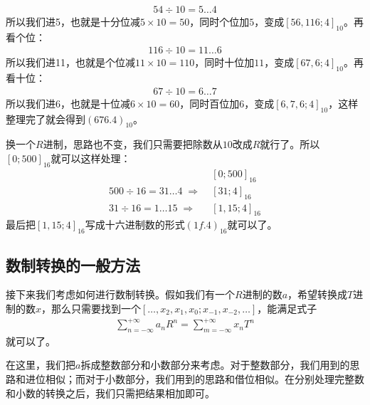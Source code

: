 \begin{align*}
54\div10=5\ldots4
\end{align*}
所以我们进5，也就是十分位减$5\times10=50$，同时个位加$5$，变成$[56,116;4]_{10}$。再看个位：
\begin{align*}
116\div10=11\ldots6
\end{align*}
所以我们进11，也就是个位减$11\times10=110$，同时十位加$11$，变成$[67,6;4]_{10}$。再看十位：
\begin{align*}
67\div10=6\ldots7
\end{align*}
所以我们进6，也就是十位减$6\times10=60$，同时百位加$6$，变成$[6,7,6;4]_{10}$，这样整理完了就会得到$(676.4)_{10}$。\par
换一个$R$进制，思路也不变，我们只需要把除数从$10$改成$R$就行了。所以$[0;500]_{16}$就可以这样处理：
\begin{align*}
{}&[0;500]_{16}\\
500\div16=31\ldots4\;\Rightarrow\;{}&[31;4]_{16}\\
31\div16=1\ldots15\;\Rightarrow\;{}&[1,15;4]_{16}
\end{align*}
最后把$[1,15;4]_{16}$写成十六进制数的形式$(1f.4)_{16}$就可以了。\par
\subsection*{数制转换的一般方法}
接下来我们考虑如何进行数制转换。假如我们有一个$R$进制的数$a$，希望转换成$T$进制的数$x$，那么只需要找到一个$[\ldots,x_2,x_1,x_0;x_{-1},x_{-2},\ldots]$，能满足式子
\begin{align*}
\sum_{n=-\infty}^{+\infty}a_nR^n=\sum_{m=-\infty}^{+\infty}x_nT^n
\end{align*}
就可以了。\par
在这里，我们把$a$拆成整数部分和小数部分来考虑。对于整数部分，我们用到的思路和进位相似；而对于小数部分，我们用到的思路和借位相似。在分别处理完整数和小数的转换之后，我们只需把结果相加即可。\par
